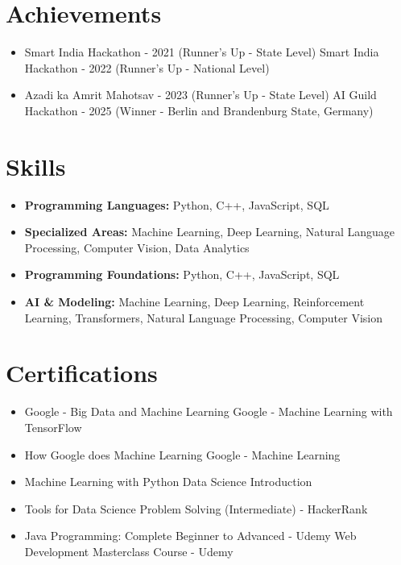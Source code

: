 \documentclass[a4paper,10pt]{article}
\begin{document}
\section*{Achievements}
\begin{itemize}
\item Smart India Hackathon - 2021 (Runner's Up - State Level) \hfill Smart India Hackathon - 2022 (Runner's Up - National Level)
\item Azadi ka Amrit Mahotsav - 2023 (Runner's Up - State Level) \hfill AI Guild Hackathon - 2025 (Winner - Berlin and Brandenburg State, Germany)
\end{itemize}

\section*{Skills}
\begin{itemize}
  \item \textbf{Programming Languages:} Python, C++, JavaScript, SQL
  \item \textbf{Specialized Areas:} Machine Learning, Deep Learning, Natural Language Processing, Computer Vision, Data Analytics
  \item \textbf{Programming Foundations:} Python, C++, JavaScript, SQL
  \item \textbf{AI \& Modeling:} Machine Learning, Deep Learning, Reinforcement Learning, Transformers, Natural Language Processing, Computer Vision
\end{itemize}

\section*{Certifications}
\begin{itemize}
\item Google - Big Data and Machine Learning \hfill Google - Machine Learning with TensorFlow
\item How Google does Machine Learning \hfill Google - Machine Learning
\item Machine Learning with Python \hfill Data Science Introduction
\item Tools for Data Science \hfill Problem Solving (Intermediate) - HackerRank
\item Java Programming: Complete Beginner to Advanced - Udemy \hfill Web Development Masterclass Course - Udemy
\end{itemize}
\end{document}
